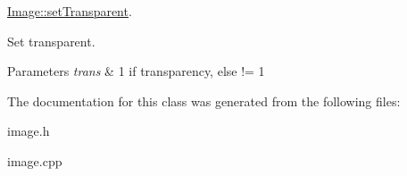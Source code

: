 \mbox{\hyperlink{class_image_a52e45825bdd0de9b53c36b1a80936cca}{Image\+::set\+Transparent}}. 

Set transparent. 
\begin{DoxyParams}{Parameters}
{\em trans} & 1 if transparency, else != 1 \\
\hline
\end{DoxyParams}


The documentation for this class was generated from the following files\+:\begin{DoxyCompactItemize}
\item 
image.\+h\item 
image.\+cpp\end{DoxyCompactItemize}

